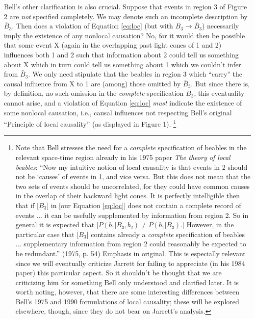 \documentclass[12pt]{article}
\begin{document}
Bell's other clarification is also crucial.  Suppose that events in
region 3 of Figure 2 are \emph{not} specified completely.  We may
denote such an incomplete description by $\bar{B}_3$.  Then does a
violation of Equation \ref{eq:loc} (but with $B_3 \rightarrow \bar{B}_3$)
necessarily imply the existence of any nonlocal causation?  No, for it
would then be possible that some event X (again in the overlapping past
light cones of 1 and 2) influences both 1 and 2 such that
information about 2 could tell us something about X which in turn
could tell us something about 1 which we couldn't infer from $\bar{B}_3$.
We only need stipulate that the beables in region 3 which ``carry''
the causal influence from X to 1 are (among) those omitted by $\bar{B}_3$.
But since there is, by definition, no such omission in the \emph{complete}
specification $B_3$, this eventuality cannot arise, and a violation of
Equation \ref{eq:loc} \emph{must} indicate the existence of some
nonlocal causation, i.e., causal influences not respecting Bell's
original ``Principle of local causality'' (as displayed in Figure 1).%
\footnote{Note that Bell stresses the need for a \emph{complete}
specification of beables in the relevant space-time region already
in his 1975 paper \emph{The theory of local beables}:  
``Now my intuitive notion of local causality is
that events in 2 should not be `causes' of events in 1, and vice
versa.  But this does not mean that the two sets of events should be
uncorrelated, for they could have common causes in the overlap of
their backward light cones.  It is perfectly intelligible then that if
[$B_3$] in [our Equation \ref{eq:loc}] 
does not contain a complete record of events ... it
can be usefully supplemented by information from region 2.  So in
general it is expected that [$P(b_1|B_3,b_2) \ne P(b_1|B_3)$.]
However, in the particular case that [$B_3$] contains already a
\emph{complete} specification of beables ... supplementary information
from region 2 could reasonably be expected to be redundant.'' 
(1975, p. 54)  Emphasis in original.  
This is especially relevant since we will eventually criticize
Jarrett for failing to appreciate (in his 1984 paper) this particular 
aspect.  So it shouldn't be thought that we are criticizing him for 
something Bell only understood and clarified later.  It is worth
noting, however, that there are some interesting differences between
Bell's 1975 and 1990 formulations of local causality; these will be
explored elsewhere, though, since they do not bear on Jarrett's analysis.}
\end{document}
